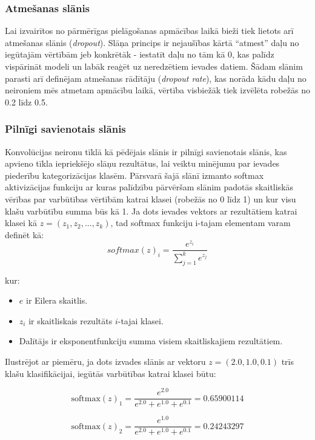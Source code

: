 \subsubsection{Atmešanas slānis}
Lai izvairītos no pārmērīgas pielāgošanas apmācības laikā bieži tiek lietots arī atmešanas slānis (\textit{dropout}). Slāņa princips ir nejaušības kārtā “atmest” daļu no iegūtajām vērtībām jeb konkrētāk - iestatīt daļu no tām kā 0, kas palīdz vispārināt modeli un labāk reaģēt uz neredzētiem ievades datiem. Šādam slānim parasti arī definējam atmešanas rādītāju (\textit{dropout rate}), kas norāda kādu daļu no neironiem mēs atmetam apmācību laikā, vērtība visbiežāk tiek izvēlēta robežās no 0.2 līdz 0.5.

\subsubsection{Pilnīgi savienotais slānis}
Konvolūcijas neironu tīklā kā pēdējais slānis ir pilnīgi savienotais slānis, kas apvieno tīkla iepriekšējo slāņu rezultātus, lai veiktu minējumu par ievades piederību kategorizācijas klasēm. Pārsvarā šajā slānī izmanto softmax aktivizācijas funkciju ar kuras palīdzību pārvēršam slānim padotās skaitliskās vērības par varbūtības vērtībām katrai klasei (robežās no 0 līdz 1) un kur visu klašu varbūtību summa būs kā 1. Ja dots ievades vektors ar rezultātiem katrai klasei kā \(z = (z_1, z_2, ..., z_k)\), tad softmax funkciju i-tajam elementam varam definēt kā:
\begin{equation}
softmax(z)_i = \frac{e^{z_i}}{\sum_{j=1}^{k} e^{z_j}}
\end{equation}

\noindent kur:
\begin{itemize}
\item \(e\) ir Eilera skaitlis.
\item \(z_i\) ir skaitliskais rezultāts \(i\)-tajai klasei.
\item Dalītājs ir eksponentfunkciju summa visiem skaitliskajiem rezultātiem.
\end{itemize}

Ilustrējot ar piemēru, ja dots izvades slānis ar vektoru \(z = (2.0, 1.0, 0.1)\) trīs klašu klasifikācijai, iegūtās varbūtības katrai klasei būtu:

\[ \text{softmax}(z)_1 = \frac{e^{2.0}}{e^{2.0} + e^{1.0} + e^{0.1}} = 0.65900114\]

\[ \text{softmax}(z)_2 = \frac{e^{1.0}}{e^{2.0} + e^{1.0} + e^{0.1}} = 0.24243297\]

